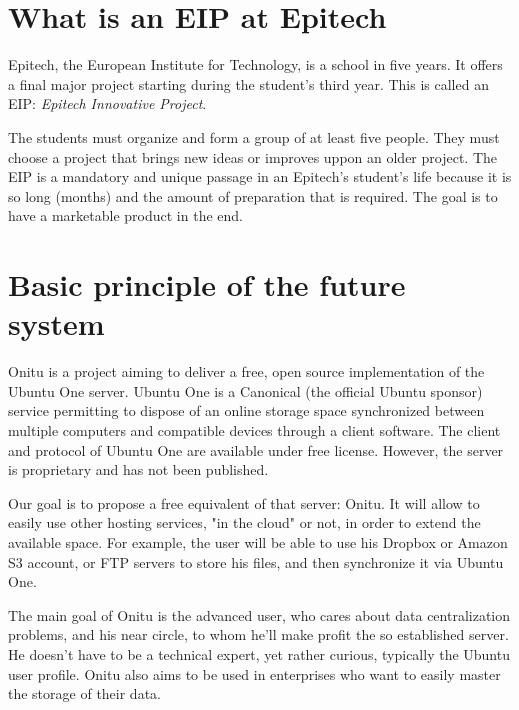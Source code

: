 \section{What is an EIP at Epitech}
Epitech, the European Institute for Technology, is a school in five years. It offers a final major project starting during the student's third year. This is called an EIP: \emph{Epitech Innovative Project}.


The students must organize and form a group of at least five people. They must choose a project that brings new ideas or improves uppon an older project. The EIP is a mandatory and unique passage in an Epitech's student's life because it is so long (months) and the amount of preparation that is required. The goal is to have a marketable product in the end.


\section{Basic principle of the future system}
Onitu is a project aiming to deliver a free, open source implementation of the Ubuntu One server. Ubuntu One is a Canonical (the official Ubuntu sponsor) service permitting to dispose of an online storage space synchronized between multiple computers and compatible devices through a client software. The client and protocol of Ubuntu One are available under free license. However, the server is proprietary and has not been published.


Our goal is to propose a free equivalent of that server: Onitu. It will allow to easily use other hosting services, "in the cloud" or not, in order to extend the available space. For example, the user will be able to use his Dropbox or Amazon S3 account, or FTP servers to store his files, and then synchronize it via Ubuntu One.


The main goal of Onitu is the advanced user, who cares about data centralization problems, and his near circle, to whom he'll make profit the so established server. He doesn't have to be a technical expert, yet rather curious, typically the Ubuntu user profile. Onitu also aims to be used in enterprises who want to easily master the storage of their data.

